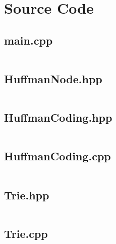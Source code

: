 \documentclass[titlepage]{article}
\begin{document}
\newpage

\section{Source Code}
\subsection{main.cpp}
\inputminted{c++}{../../src/main.cpp}
\subsection{HuffmanNode.hpp}
\inputminted{c++}{../../include/HuffmanNode.hpp}
\subsection{HuffmanCoding.hpp}
\inputminted{c++}{../../include/HuffmanCoding.hpp}
\subsection{HuffmanCoding.cpp}
\inputminted{c++}{../../src/HuffmanCoding.cpp}
\subsection{Trie.hpp}
\inputminted{c++}{../../include/Trie.hpp}
\subsection{Trie.cpp}
\inputminted{c++}{../../src/Trie.cpp}
\end{document}
